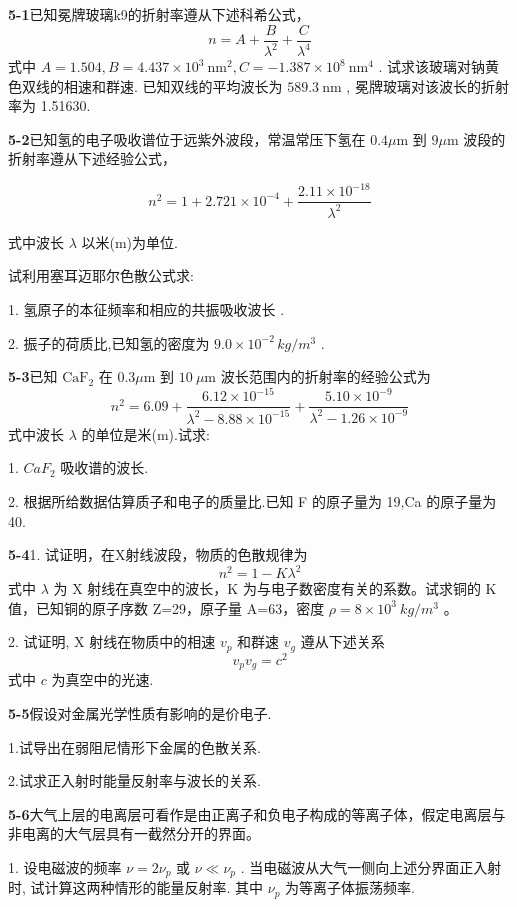 \textbf{5-1}已知冕牌玻璃k9的折射率遵从下述科希公式，
$$ n = A + \frac {B}{\lambda^ {2}} + \frac {C}{\lambda^ {4}} $$
式中 $A = 1.504, B = 4.437 \times 10^{3} \mathrm{~nm}^{2}, C = -1.387 \times 10^{8} \mathrm{~nm}^{4}$ . 试求该玻璃对钠黄色双线的相速和群速. 已知双线的平均波长为 $589.3 \mathrm{~nm}$ , 冕牌玻璃对该波长的折射率为 1.51630.
\vfill
\newpage

\textbf{5-2}已知氢的电子吸收谱位于远紫外波段，常温常压下氢在 $0.4\mu \mathrm{m}$ 到 $9\mu \mathrm{m}$ 波段的折射率遵从下述经验公式，

$$ n ^ {2} = 1 + 2. 7 2 1 \times 1 0 ^ {- 4} + \frac {2 . 1 1 \times 1 0 ^ {- 1 8}}{\lambda^ {2}} $$

式中波长 $\lambda$ 以米(m)为单位.

试利用塞耳迈耶尔色散公式求:

1. 氢原子的本征频率和相应的共振吸收波长 .

2. 振子的荷质比,已知氢的密度为 $9.0 \times 10^{-2} \, kg/m^{3}$ .
\vfill
\newpage

\textbf{5-3}已知 $\mathrm{CaF}_2$ 在 $0.3\mu \mathrm{m}$ 到 $10~\mu \mathrm{m}$ 波长范围内的折射率的经验公式为
$$ n ^ {2} = 6. 0 9 + \frac {6 . 1 2 \times 1 0 ^ {- 1 5}}{\lambda^ {2} - 8 . 8 8 \times 1 0 ^ {- 1 5}} + \frac {5 . 1 0 \times 1 0 ^ {- 9}}{\lambda^ {2} - 1 . 2 6 \times 1 0 ^ {- 9}} $$
式中波长 $\lambda$ 的单位是米(m).试求:

1. $CaF_{2}$ 吸收谱的波长.

2. 根据所给数据估算质子和电子的质量比.已知 F 的原子量为 19,Ca 的原子量为 40.
\vfill
\newpage

\textbf{5-4}1. 试证明，在X射线波段，物质的色散规律为
$$ n ^ {2} = 1 - K \lambda^ {2} $$
式中 $\lambda$ 为 X 射线在真空中的波长，K 为与电子数密度有关的系数。试求铜的 K 值，已知铜的原子序数 Z=29，原子量 A=63，密度 $\rho=8\times10^{3}\ kg/m^{3}$ 。

2. 试证明, X 射线在物质中的相速 $v_{p}$ 和群速 $v_{g}$ 遵从下述关系
$$ v _ {p} v _ {g} = c ^ {2} $$
式中 $c$ 为真空中的光速.
\vfill
\newpage

\textbf{5-5}假设对金属光学性质有影响的是价电子.

1.试导出在弱阻尼情形下金属的色散关系.

2.试求正入射时能量反射率与波长的关系.
\vfill
\newpage

\textbf{5-6}大气上层的电离层可看作是由正离子和负电子构成的等离子体，假定电离层与非电离的大气层具有一截然分开的界面。

1. 设电磁波的频率 $\nu = 2\nu_{p}$ 或 $\nu \ll \nu_{p}$ . 当电磁波从大气一侧向上述分界面正入射时, 试计算这两种情形的能量反射率. 其中 $\nu_{p}$ 为等离子体振荡频率. 

